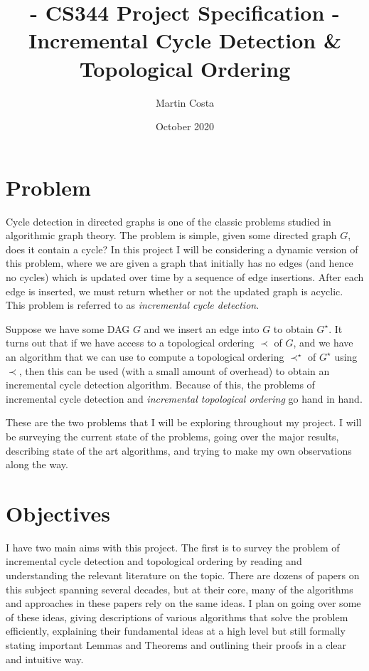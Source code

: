 \documentclass{article}
\title{- CS344 Project Specification - \\  Incremental Cycle Detection \& Topological Ordering }
\author{Martin Costa}
\date{October 2020}
\begin{document}
\maketitle

\section{Problem}

Cycle detection in directed graphs is one of the classic problems studied in algorithmic graph theory. The problem is simple, given some directed graph $G$, does it contain a cycle? In this project I will be considering a dynamic version of this problem, where we are given a graph that initially has no edges (and hence no cycles) which is updated over time by a sequence of edge insertions. After each edge is inserted, we must return whether or not the updated graph is acyclic. This problem is referred to as \textit{incremental cycle detection}.

Suppose we have some DAG $G$ and we insert an edge into $G$ to obtain $G^{\star}$. It turns out that if we have access to a topological ordering $\prec$ of $G$, and we have an algorithm that we can use to compute a topological ordering $\prec^{\star}$ of $G^{\star}$ using $\prec$, then this can be used (with a small amount of overhead) to obtain an incremental cycle detection algorithm. Because of this, the problems of incremental cycle detection and \textit{incremental topological ordering} go hand in hand.

These are the two problems that I will be exploring throughout my project. I will be surveying the current state of the problems, going over the major results, describing state of the art algorithms, and trying to make my own observations along the way.

\section{Objectives}

I have two main aims with this project. The first is to survey the problem of incremental cycle detection and topological ordering by reading and understanding the relevant literature on the topic. There are dozens of papers on this subject spanning several decades, but at their core, many of the algorithms and approaches in these papers rely on the same ideas. I plan on going over some of these ideas, giving descriptions of various algorithms that solve the problem efficiently, explaining their fundamental ideas at a high level but still formally stating important Lemmas and Theorems and outlining their proofs in a clear and intuitive way.
\end{document}
